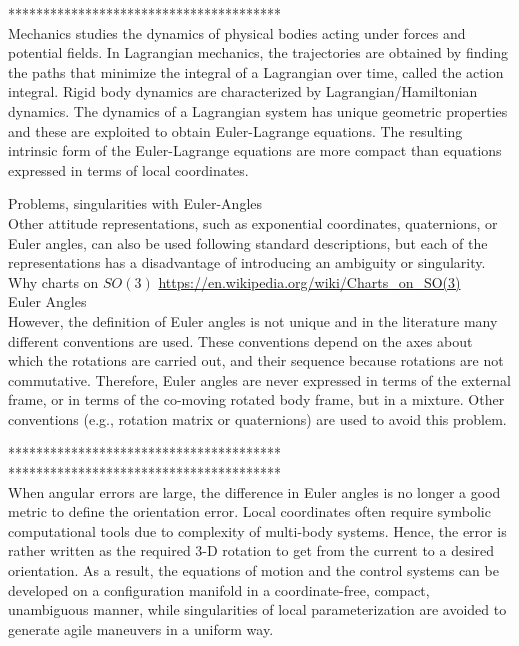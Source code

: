***************************************\\
Mechanics studies the dynamics of physical bodies acting under forces and potential fields. 
In Lagrangian mechanics, the trajectories are obtained by finding the paths that minimize the integral of a Lagrangian over time, called the action integral. 
Rigid body dynamics are characterized by Lagrangian/Hamiltonian dynamics. The dynamics of a Lagrangian system has unique geometric properties and these are exploited to obtain Euler-Lagrange equations. The resulting intrinsic form of the Euler-Lagrange equations are more compact than equations expressed in terms of local coordinates.


Problems, singularities with Euler-Angles\\
Other attitude representations, such as exponential coordinates, quaternions, or Euler
angles, can also be used following standard descriptions, but each of the representations has a disadvantage
of introducing an ambiguity or singularity.
Why charts on $ SO(3) $ \url{https://en.wikipedia.org/wiki/Charts_on_SO(3)}\\

Euler Angles\\
However, the definition of Euler angles is not unique and in the literature many different conventions are used. These conventions depend on the axes about which the rotations are carried out, and their sequence because rotations are not commutative. Therefore, Euler angles are never expressed in terms of the external frame, or in terms of the co-moving rotated body frame, but in a mixture. Other conventions (e.g., rotation matrix or quaternions) are used to avoid this problem.

***************************************\\

***************************************\\

When angular errors are large, the difference in Euler angles is no longer a good metric to define the orientation error. Local coordinates often require symbolic computational tools due to complexity of multi-body systems. Hence, the error is rather written as the required 3-D rotation to get from the current to a desired orientation. As a result, the equations of motion and the control systems can be developed on a configuration manifold in a coordinate-free, compact, unambiguous manner, while singularities of local parameterization are avoided to generate agile maneuvers in a uniform way. 			


